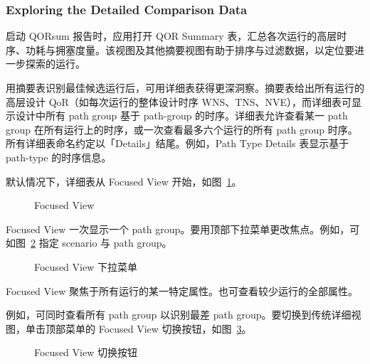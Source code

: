 \subsubsection*{Exploring the Detailed Comparison Data}

启动 QORsum 报告时，应用打开 QOR Summary 表，汇总各次运行的高层时序、功耗与拥塞度量。该视图及其他摘要视图有助于排序与过滤数据，以定位要进一步探索的运行。

用摘要表识别最佳候选运行后，可用详细表获得更深洞察。摘要表给出所有运行的高层设计 QoR（如每次运行的整体设计时序 WNS、TNS、NVE），而详细表可显示设计中所有 path group 基于 path-group 的时序。详细表允许查看某一 path group 在所有运行上的时序，或一次查看最多六个运行的所有 path group 时序。所有详细表命名约定以「Details」结尾。例如，Path Type Details 表显示基于 path-type 的时序信息。

默认情况下，详细表从 Focused View 开始，如图~\ref{fig:focused-view}。

\begin{figure}[htbp]
\centering
{}
\caption{Focused View}
\label{fig:focused-view}
\end{figure}

Focused View 一次显示一个 path group。要用顶部下拉菜单更改焦点。例如，可如图~\ref{fig:focused-dd} 指定 scenario 与 path group。

\begin{figure}[htbp]
\centering
{}
\caption{Focused View 下拉菜单}
\label{fig:focused-dd}
\end{figure}

Focused View 聚焦于所有运行的某一特定属性。也可查看较少运行的全部属性。

例如，可同时查看所有 path group 以识别最差 path group。要切换到传统详细视图，单击顶部菜单的 Focused View 切换按钮，如图~\ref{fig:focused-toggle}。

\begin{figure}[htbp]
\centering
{}
\caption{Focused View 切换按钮}
\label{fig:focused-toggle}
\end{figure}

